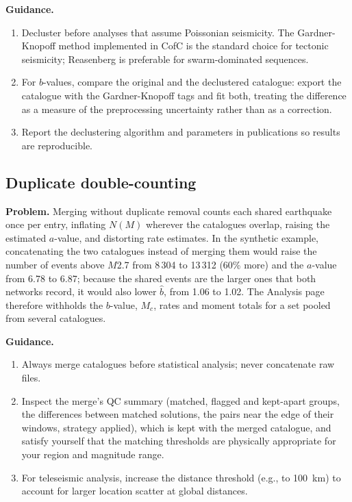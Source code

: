 \documentclass[12pt]{article}
\begin{document}
\textbf{Guidance.}
\begin{enumerate}[leftmargin=*]
  \item Decluster before analyses that assume Poissonian seismicity.  The
    Gardner-Knopoff method \citep{gardner1974} implemented in CofC is the
    standard choice for tectonic seismicity; Reasenberg
    \citeyearpar{reasenberg1985} is preferable for swarm-dominated sequences.
  \item For $b$-values, compare the original and the declustered catalogue:
    export the catalogue with the Gardner-Knopoff tags and fit both, treating the
    difference as a measure of the preprocessing uncertainty rather than as a
    correction.
  \item Report the declustering algorithm and parameters in publications so
    results are reproducible.
\end{enumerate}

\subsection{Duplicate double-counting}

\textbf{Problem.}  Merging without duplicate removal counts each shared
earthquake once per entry, inflating $N(M)$ wherever the catalogues overlap,
raising the estimated $a$-value, and distorting rate estimates.  In the
synthetic example, concatenating the two catalogues instead of merging them
would raise the number of events above $M$2.7 from 8\,304 to 13\,312 (60\%
more) and the $a$-value from 6.78 to 6.87; because the shared events are the
larger ones that both networks record, it would also lower $\hat{b}$, from 1.06 to
1.02.  The Analysis page therefore withholds the $b$-value, $M_c$, rates and
moment totals for a set pooled from several catalogues.

\textbf{Guidance.}
\begin{enumerate}[leftmargin=*]
  \item Always merge catalogues before statistical analysis; never concatenate
    raw files.
  \item Inspect the merge's QC summary (matched, flagged and kept-apart groups,
    the differences between matched solutions, the pairs near the edge of their
    windows, strategy applied), which is kept with the merged catalogue, and
    satisfy yourself that the matching thresholds are physically appropriate for
    your region and magnitude range.
  \item For teleseismic analysis, increase the distance threshold (e.g., to
    100~km) to account for larger location scatter at global distances.
\end{enumerate}
\end{document}
